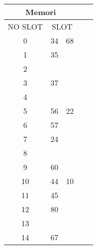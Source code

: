 \documentclass[12pt,a4paper]{article}
\begin{document}
\begin{enumerate}
\begin{multicols}{2}
      \begin{center}
        \begin{adjustbox}{scale=1,center}
          \begin{tabular}{ |c|c|c|c|c| } 
            \hline \multicolumn{3}{|c|}{Memori} \\ \hline \hline 
            NO SLOT & \multicolumn{2}{c|}{SLOT} \\ \hline
            0       & 34   & 68  \\ \hline
            1       & 35   &     \\ \hline
            2       &      &     \\ \hline
            3       & 37   &     \\ \hline
            4       &      &     \\ \hline
            5       & 56   & 22  \\ \hline
            6       & 57   &     \\ \hline
            7       & 24   &     \\ \hline
            8       &      &     \\ \hline
            9       & 60   &     \\ \hline
            10      & 44   & 10  \\ \hline
            11      & 45   &     \\ \hline
            12      & 80   &     \\ \hline
            13      &      &     \\ \hline
            14      & 67   &     \\ \hline

          \end{tabular}
        \end{adjustbox}
      \end{center}


\end{multicols}
\end{enumerate}
\end{document}
